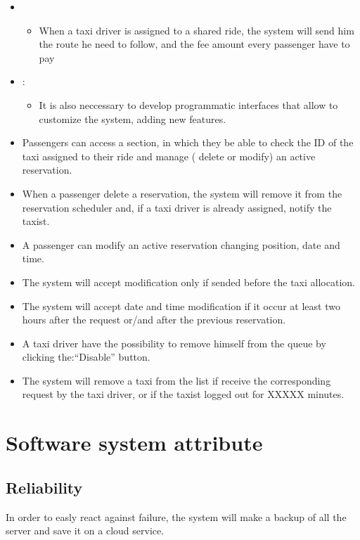 \begin {itemize}
\begin{itemize}
	\end{itemize}
\item[G7]
	\begin{itemize}
	\item When a taxi driver is assigned to a shared ride, the system will send him the route he need to follow, and the fee amount every passenger have to pay
	\end{itemize}
\item[G8]:
	\begin{itemize}
	\item  It is also neccessary to develop programmatic interfaces that allow to customize the system, adding new features.
	\end{itemize}
\end {itemize}
\begin{itemize}
 \item Passengers can access a section, in which they be able to check the ID of the taxi assigned to their ride and manage ( delete or modify) an active reservation. %
 \item When a passenger delete a reservation, the system will remove it from the reservation scheduler and, if a taxi driver is already assigned, notify the taxist.
 \item A passenger can modify an active reservation changing position, date and time.
 \item The system will accept modification only if sended before the taxi allocation.
 \item The system will accept date and time modification if it occur at least two hours after the request or/and after the previous reservation.
 \item A taxi driver have the possibility to remove himself from the queue by clicking the:``Disable'' button.
 \item The system will remove a taxi from the list if receive the corresponding request by the taxi driver, or if the taxist logged out for XXXXX minutes. %
\end{itemize}
\section{Software system attribute}
  \subsection{Reliability}
  In order to easly react against failure, the system will make a backup of all the server and save it on a cloud service.
